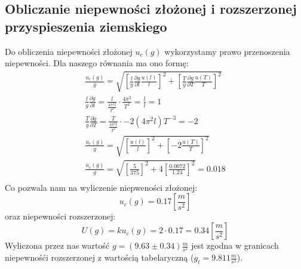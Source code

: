 \documentclass{fizraport}
\begin{document}
\subsection{Obliczanie niepewności złożonej i rozszerzonej przyspieszenia ziemskiego}
Do obliczenia niepewności złożonej $u_c(g)$ wykorzystamy prawo przenoszenia niepewności.
Dla naszego równania ma ono formę:
\begin{equation*}
\begin{split}
\frac{u_c(g)}{g} = \sqrt{ \left[\frac{l}{g}\frac{\partial g}{\partial l}\frac{u(l)}{l}\right]^2+ \left[\frac{T}{g}\frac{\partial g}{\partial T}\frac{u(T)}{T}\right]^2 }\\
\frac{l}{g}\frac{\partial g}{\partial l} = \frac{l}{\frac{4\pi^2 l}{T^2}}\cdot\frac{4\pi^2}{T^2} = \frac{l}{l}=1\\
\frac{T}{g}\frac{\partial g}{\partial T} = \frac{T}{\frac{4\pi^2 l}{T^2}}\cdot-2(4\pi^2l)T^{-3}=-2\\
\frac{u_c(g)}{g} = \sqrt{ \left[\frac{u(l)}{l}\right]^2+ \left[-2\frac{u(T)}{T}\right]^2 }\\
\frac{u_c(g)}{g} = \sqrt{ \left[\frac{5}{375}\right]^2+ 4\left[\frac{0.0072}{1.24}\right]^2 } = 0.018\\
\end{split}
\end{equation*}
Co pozwala nam na wyliczenie niepweności złożonej:
\[u_c(g) = 0.17 \left[\frac{m}{s^2}\right] \]
oraz niepewności rozszerzonej:
\[U(g) =k u_c(g) =2 \cdot 0.17 = 0.34\left[\frac{m}{s^2}\right] \]
Wyliczona przez nas wartość $g=(9.63\pm0.34) \frac{m}{s^2} $ jest zgodna w granicach niepewnośći rozszerzonej z wartością tabelaryczną ($ g_t = 9.811 \frac{m}{s^2}$).
\pagebreak
\end{document}
